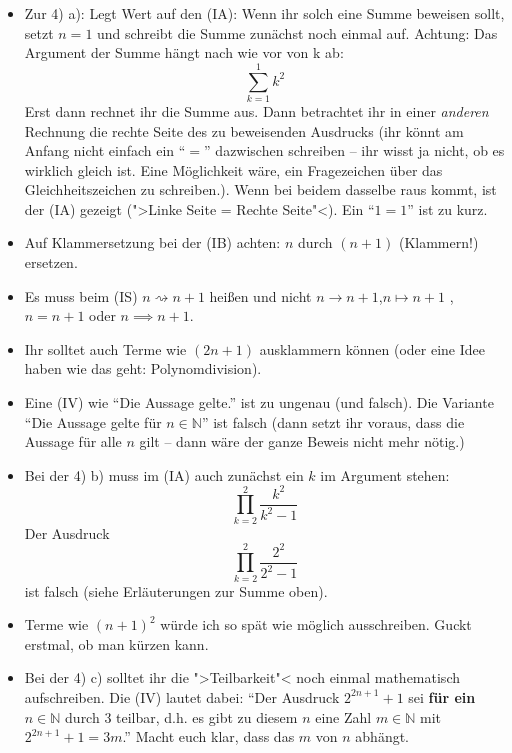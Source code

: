\documentclass[11pt, a4paper]{article}
\newcommand{\N}{\mathbb{N}}
\begin{document}
\begin{itemize}
\item Zur 4) a): Legt Wert auf den (IA): Wenn ihr solch eine Summe beweisen sollt, setzt $n = 1$ und schreibt die Summe zunächst noch einmal auf. Achtung: Das Argument der Summe hängt nach wie vor von k ab:
\begin{equation*}
\sum_{k=1}^1 k^2
\end{equation*}
Erst dann rechnet ihr die Summe aus. Dann betrachtet ihr in einer \emph{anderen} Rechnung die rechte Seite des zu beweisenden Ausdrucks (ihr könnt am Anfang nicht einfach ein \enquote{$=$} dazwischen schreiben -- ihr wisst ja nicht, ob es wirklich gleich ist. Eine Möglichkeit wäre, ein Fragezeichen über das Gleichheitszeichen zu schreiben.). Wenn bei beidem dasselbe raus kommt, ist der (IA) gezeigt (">Linke Seite = Rechte Seite"<). Ein \enquote{$1 = 1$} ist zu kurz.

\item Auf Klammersetzung bei der (IB) achten: $n$ durch $(n+1)$ (Klammern!) ersetzen. 

\item Es muss beim (IS) $n \rightsquigarrow n + 1$ heißen und nicht $n \longrightarrow n + 1$,$n \longmapsto n + 1$ , $n = n + 1$ oder $n \implies n + 1$.

\item Ihr solltet auch Terme wie $(2n + 1)$ ausklammern können (oder eine Idee haben wie das geht: Polynomdivision).

\item Eine (IV) wie \enquote{Die Aussage gelte.} ist zu ungenau (und falsch). Die Variante \enquote{Die Aussage gelte für $n \in \N$} ist falsch (dann setzt ihr voraus, dass die Aussage für alle $n$ gilt -- dann wäre der ganze Beweis nicht mehr nötig.) 

\item Bei der 4) b) muss im (IA) auch zunächst ein $k$ im Argument stehen:
\begin{equation*}
\prod_{k=2}^2 \frac{k^2}{k^2 - 1}
\end{equation*}
Der Ausdruck
\begin{equation*}
\prod_{k=2}^2 \frac{2^2}{2^2 - 1}
\end{equation*}
ist falsch (siehe Erläuterungen zur Summe oben).

\item Terme wie $(n+1)^2$ würde ich so spät wie möglich ausschreiben. Guckt erstmal, ob man kürzen kann.

\item Bei der 4) c) solltet ihr die ">Teilbarkeit"< noch einmal mathematisch aufschreiben. Die (IV) lautet dabei: \enquote{Der Ausdruck $2^{2n+1}+1$ sei \textbf{für ein} $n \in \N$ durch 3 teilbar, d.h. es gibt zu diesem $n$ eine Zahl $m \in \N$ mit $2^{2n+1}+1 = 3m$.} Macht euch klar, dass das $m$ von $n$ abhängt. 


\end{itemize}
\end{document}
